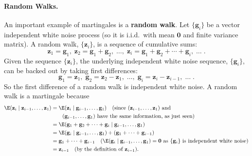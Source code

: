\paragraph{Random Walks.}
An important example of martingales is a \textbf{random walk}.  Let $\{\mathbf{g}_i\}$
be a vector independent white noise process (so it is i.i.d.\ with mean $\mathbf{0}$
and finite variance matrix).  A random walk, $\{\mathbf{z}_i\}$, is a sequence of
cumulative sums:
\begin{equation}
  \mathbf{z}_1 = \mathbf{g}_1,\;
  \mathbf{z}_2 = \mathbf{g}_1 + \mathbf{g}_2,\; \ldots,\;
  \mathbf{z}_i = \mathbf{g}_1 + \mathbf{g}_2 + \cdots + \mathbf{g}_i, \;\ldots\;.
  \label{eq:2.2.6}
\end{equation}
Given the sequence $\{\mathbf{z}_i\}$, the underlying independent white noise
sequence, $\{\mathbf{g}_i\}$, can be backed out by taking first differences:
\begin{equation}
  \mathbf{g}_1 = \mathbf{z}_1,\;
  \mathbf{g}_2 = \mathbf{z}_2 - \mathbf{z}_1,\; \ldots,\;
  \mathbf{g}_i = \mathbf{z}_i - \mathbf{z}_{i-1},\; \ldots\;.
  \label{eq:2.2.7}
\end{equation}
So the first difference of a random walk is independent white noise.  A random walk
is a martingale because
\begin{align}
  \E(\mathbf{z}_i \mid \mathbf{z}_{i-1}, \ldots, \mathbf{z}_1)
  &= \E(\mathbf{z}_i \mid \mathbf{g}_{i-1}, \ldots, \mathbf{g}_1)
     \quad (\text{since } (\mathbf{z}_{i-1}, \ldots, \mathbf{z}_1) \text{ and}
     \notag \\
  &\qquad (\mathbf{g}_{i-1}, \ldots, \mathbf{g}_1) \text{ have the same information,
     as just seen}) \notag \\
  &= \E(\mathbf{g}_1 + \mathbf{g}_2 + \cdots + \mathbf{g}_i \mid
     \mathbf{g}_{i-1}, \ldots, \mathbf{g}_1) \notag \\
  &= \E(\mathbf{g}_i \mid \mathbf{g}_{i-1}, \ldots, \mathbf{g}_1)
     + (\mathbf{g}_1 + \cdots + \mathbf{g}_{i-1}) \notag \\
  &= \mathbf{g}_1 + \cdots + \mathbf{g}_{i-1} \quad
     (\E(\mathbf{g}_i \mid \mathbf{g}_{i-1}, \ldots, \mathbf{g}_1) = \mathbf{0}
     \text{ as } \{\mathbf{g}_i\} \text{ is independent white noise}) \notag \\
  &= \mathbf{z}_{i-1} \quad (\text{by the definition of } \mathbf{z}_{i-1}).
  \label{eq:2.2.8}
\end{align}

